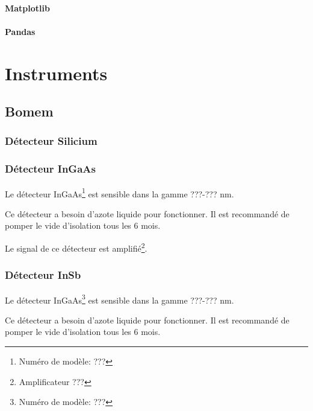 \documentclass[11pt,francais]{book} %
\begin{document}
\subsubsection{Matplotlib}

\subsubsection{Pandas}




\chapter{Instruments}


\section{Bomem}

\subsection{Détecteur Silicium}

\subsection{Détecteur InGaAs}

Le détecteur InGaAs\footnote{Numéro de modèle: ???} est sensible dans la gamme ???-??? nm.

Ce détecteur a besoin d'azote liquide pour fonctionner.
Il est recommandé de pomper le vide d'isolation tous les 6 mois.

Le signal de ce détecteur est amplifié\footnote{Amplificateur ???}.

\subsection{Détecteur InSb}
Le détecteur InGaAs\footnote{Numéro de modèle: ???} est sensible dans la gamme ???-??? nm.

Ce détecteur a besoin d'azote liquide pour fonctionner.
Il est recommandé de pomper le vide d'isolation tous les 6 mois.
\end{document}
